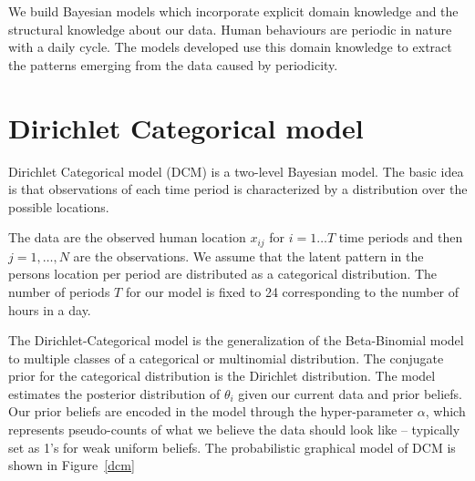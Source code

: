 We build Bayesian models which incorporate explicit domain knowledge and the structural knowledge about our data. Human behaviours are periodic in nature with a daily cycle. The models developed use this domain knowledge to extract the patterns emerging from the data caused by periodicity.

\section{Dirichlet Categorical model }

Dirichlet Categorical model (DCM) is a two-level Bayesian model. The basic idea is that observations of each time period is characterized by a distribution over the possible locations.

The data are the observed human location $x_{ij}$ for $i = 1 \dots T$ time periods and then $j = 1, \dots , N$  are the observations.  We assume that the latent pattern in the persons location per period are distributed as a categorical distribution. The number of periods $T$ for our model is fixed to 24 corresponding to the number of hours in a day. 

The Dirichlet-Categorical model is the generalization of the Beta-Binomial model to multiple classes of a categorical or multinomial distribution. The conjugate prior for the categorical distribution is the Dirichlet distribution. The model estimates the posterior distribution of $\theta_i$ given our current data and prior beliefs. Our prior beliefs are encoded in the model through the hyper-parameter $\alpha$, which represents pseudo-counts of what we believe the data should look like – typically set as 1's for weak uniform beliefs. The probabilistic graphical model of  DCM is shown in Figure~\ref{dcm}

